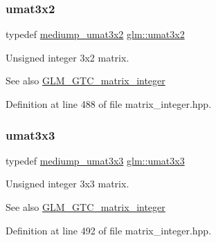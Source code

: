 \mbox{\label{group__gtc__matrix__integer_ga257300f2710612877ef45438a366e308}} 
\subsubsection{\texorpdfstring{umat3x2}{umat3x2}}
{\footnotesize\ttfamily typedef \hyperlink{group__gtc__matrix__integer_ga65a9fdb1a5918fe6f308577065983e23}{mediump\+\_\+umat3x2} \hyperlink{group__gtc__matrix__integer_ga257300f2710612877ef45438a366e308}{glm\+::umat3x2}}

Unsigned integer 3x2 matrix. \begin{DoxySeeAlso}{See also}
\hyperlink{group__gtc__matrix__integer}{G\+L\+M\+\_\+\+G\+T\+C\+\_\+matrix\+\_\+integer} 
\end{DoxySeeAlso}


Definition at line 488 of file matrix\+\_\+integer.\+hpp.

\mbox{\label{group__gtc__matrix__integer_gab80b6501ba1b2c40119a0f2d256f4c97}} 
\subsubsection{\texorpdfstring{umat3x3}{umat3x3}}
{\footnotesize\ttfamily typedef \hyperlink{group__gtc__matrix__integer_ga31a05e7b2a6a596bdc7ceeb5d9c10e1c}{mediump\+\_\+umat3x3} \hyperlink{group__gtc__matrix__integer_gab80b6501ba1b2c40119a0f2d256f4c97}{glm\+::umat3x3}}

Unsigned integer 3x3 matrix. \begin{DoxySeeAlso}{See also}
\hyperlink{group__gtc__matrix__integer}{G\+L\+M\+\_\+\+G\+T\+C\+\_\+matrix\+\_\+integer} 
\end{DoxySeeAlso}


Definition at line 492 of file matrix\+\_\+integer.\+hpp.

\mbox{\label{group__gtc__matrix__integer_ga5410857d098a989a30b4017100bc2ff7}} 
